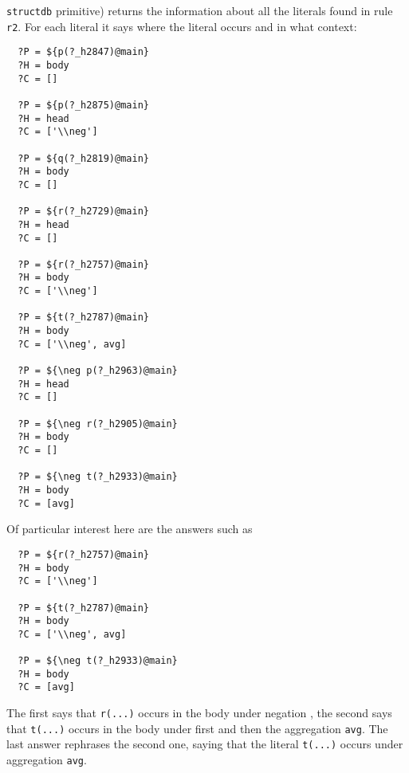 \texttt{structdb} primitive) returns the information about all the literals
found in rule \texttt{r2}. For each literal it says where the literal
occurs and in what context:
\begin{verbatim}
  ?P = ${p(?_h2847)@main}
  ?H = body
  ?C = []

  ?P = ${p(?_h2875)@main}
  ?H = head
  ?C = ['\\neg']

  ?P = ${q(?_h2819)@main}
  ?H = body
  ?C = []

  ?P = ${r(?_h2729)@main}
  ?H = head
  ?C = []

  ?P = ${r(?_h2757)@main}
  ?H = body
  ?C = ['\\neg']

  ?P = ${t(?_h2787)@main}
  ?H = body
  ?C = ['\\neg', avg]

  ?P = ${\neg p(?_h2963)@main}
  ?H = head
  ?C = []

  ?P = ${\neg r(?_h2905)@main}
  ?H = body
  ?C = []

  ?P = ${\neg t(?_h2933)@main}
  ?H = body
  ?C = [avg]
\end{verbatim}
Of particular interest here are the answers such as
\begin{verbatim}
  ?P = ${r(?_h2757)@main}
  ?H = body
  ?C = ['\\neg']

  ?P = ${t(?_h2787)@main}
  ?H = body
  ?C = ['\\neg', avg]

  ?P = ${\neg t(?_h2933)@main}
  ?H = body
  ?C = [avg]
\end{verbatim}
The first says that \texttt{r(...)} occurs in the body under negation
\texttt{\RULELOGNEG}, the second says that
\texttt{t(...)} occurs in the body under first 
\texttt{\RULELOGNEG} and then the aggregation \texttt{avg}. The last answer
rephrases the second one, saying that the literal \texttt{\RULELOGNEG}
\texttt{t(...)} occurs under aggregation \texttt{avg}. 

